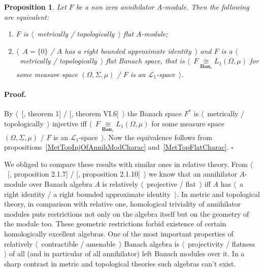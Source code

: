 \documentclass[12pt]{article}
\newcommand{\isom}[1]{\mathop{\mathbin{\cong}}\limits_{#1}}
\newtheorem{proposition}[theorem]{Proposition}
\renewenvironment{proof}{\paragraph{Proof.}}{\hfill$\square$\medskip}
\begin{document}
\begin{proposition}\label{MetTopFlatAnnihModCharac} Let $F$ be a non zero
    annihilator $A$-module. Then the following are equivalent:
    \begin{enumerate}[label = (\roman*)]
        \item $F$ is $\langle$~metrically / topologically~$\rangle$ flat
              $A$-module;

        \item $\langle$~$A=\{0\}$ / $A$ has a right bounded approximate
              identity~$\rangle$ and $F$ is a $\langle$~metrically /
              topologically~$\rangle$ flat Banach space, that is
              $\langle$~$F\isom{\mathbf{Ban}_1}L_1(\Omega,\mu)$ for some measure
              space $(\Omega, \Sigma, \mu)$ / $F$ is an
              $\mathscr{L}_1$-space~$\rangle$.
    \end{enumerate}
\end{proposition}
\begin{proof} By $\langle$~[\cite{GrothMetrProjFlatBanSp}, theorem 1] /
    [\cite{StegRethNucOpL1LInfSp}, theorem VI.6]~$\rangle$ the Banach space
    $F^*$ is $\langle$~metrically / topologically~$\rangle$ injective iff
    $\langle$~$F\isom{\mathbf{Ban}_1}L_1(\Omega,\mu)$ for some measure space
    $(\Omega, \Sigma, \mu)$ / $F$ is an $\mathscr{L}_1$-space~$\rangle$. Now the
    equivalence follows from propositions~\ref{MetTopInjOfAnnihModCharac}
    and~\ref{MetTopFlatCharac}.
\end{proof}

We obliged to compare these results with similar ones in relative theory. From
$\langle$~[\cite{RamsHomPropSemgroupAlg}, proposition 2.1.7] /
[\cite{RamsHomPropSemgroupAlg}, proposition 2.1.10]~$\rangle$ we know that an
annihilator $A$-module over Banach algebra $A$ is relatively
$\langle$~projective / flat~$\rangle$ iff $A$ has $\langle$~a right identity / a
right bounded approximate identity~$\rangle$. In metric and topological theory,
in comparison with relative one, homological triviality of annihilator modules
puts restrictions not only on the algebra itself but on the geometry of the
module too. These geometric restrictions forbid existence of certain
homologically excellent algebras. One of the most important properties of
relatively $\langle$~contractible / amenable~$\rangle$ Banach algebra is
$\langle$~projectivity / flatness~$\rangle$ of all (and in particular of all
annihilator) left Banach modules over it. In a sharp contrast in metric and
topological theories such algebras can't exist.
\end{document}
